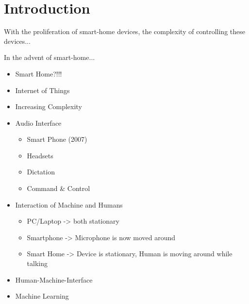 \chapter{Introduction}
\label{chap:intro}

With the proliferation of smart-home devices, the complexity of controlling these devices...

In the advent of smart-home...

\begin{itemize}\itemsep1pt
\item Smart Home?!!!
\item Internet of Things
\item Increasing Complexity
\item Audio Interface
\begin{itemize}\itemsep1pt
\item Smart Phone (2007)
\item Headsets
\item Dictation
\item Command \& Control
\end{itemize}
\item Interaction of Machine and Humans
\begin{itemize}\itemsep1pt
\item PC/Laptop -> both stationary
\item Smartphone -> Microphone is now moved around
\item Smart Home -> Device is stationary, Human is moving around while talking
\end{itemize}
\item Human-Machine-Interface
\item Machine Learning
\end{itemize}